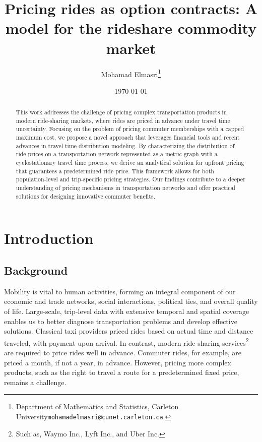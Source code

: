 \documentclass[12pt]{article}
\begin{document}
\title{Pricing rides as option contracts: A model for the rideshare commodity market}

\author{Mohamad Elmasri\thanks{Department of Mathematics and Statistics, Carleton University\texttt{mohamadelmasri@cunet.carleton.ca}.}}
\date{\today}
\maketitle
\tableofcontents

\vspace{-0.25in}
\begin{abstract}
    This work addresses the challenge of pricing complex transportation products in modern ride-sharing markets, where rides are priced in advance under travel time uncertainty.  Focusing on the problem of pricing commuter memberships with a capped maximum cost, we propose a novel approach that leverages financial tools and recent advances in travel time distribution modeling.  By characterizing the distribution of ride prices on a transportation network represented as a metric graph with a cyclostationary travel time process, we derive an analytical solution for upfront pricing that guarantees a predetermined ride price. This framework allows for both population-level and trip-specific pricing strategies.  Our findings contribute to a deeper understanding of pricing mechanisms in transportation networks and offer practical solutions for designing innovative commuter benefits.
\end{abstract}
\section{Introduction}\label{sec:introduction}
\subsection{Background}
Mobility is vital to human activities, forming an integral component of our economic and trade networks, social interactions, political ties, and overall quality of life. Large-scale, trip-level data with extensive temporal and spatial coverage enables us to better diagnose transportation problems and develop effective solutions. Classical taxi providers priced rides based on actual time and distance traveled, with payment upon arrival. In contrast, modern ride-sharing services\footnote{Such as, Waymo Inc., Lyft Inc., and Uber Inc.} are required to price rides well in advance. Commuter rides, for example, are priced a month, if not a year, in advance. However, pricing more complex products, such as the right to travel a route for a predetermined fixed price, remains a challenge.
\end{document}

